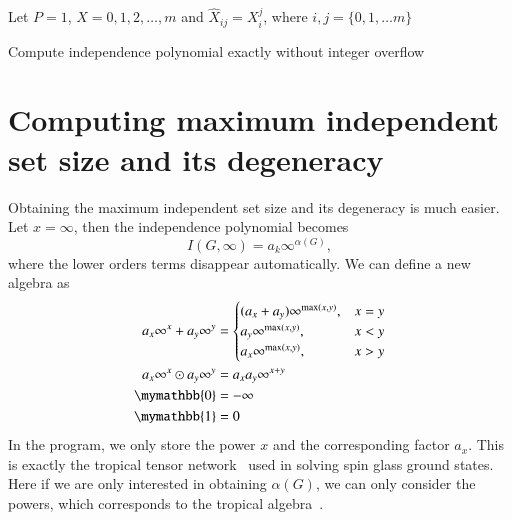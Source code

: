 \documentclass{article}
\newcommand{\<}{\langle}
\renewcommand{\>}{\rangle}
\renewcommand{\cite}[1]{{\citep{#1}}}
\theoremstyle{definition}\newtheorem{definition}{\textit{Definition}}
\begin{document}
\begin{algorithm}[!ht]
    \small
    \SetAlgoNoLine
    \LinesNumbered
    Let $P = 1$, $X = {0,1,2,\ldots,m}$ and $\hat X_{ij} = X_i^j$, where $i,j = \{0, 1, \ldots m\}$\;
    \caption{Compute independence polynomial exactly without integer overflow}\label{alg:finitefield}
\end{algorithm}

\section{Computing maximum independent set size and its degeneracy}
Obtaining the maximum independent set size and its degeneracy is much easier. Let $x=\infty$, then the independence polynomial becomes
\begin{equation}
I(G, \infty) = a_k \infty^{\alpha(G)},
\end{equation}
where the lower orders terms disappear automatically. We can define a new algebra as
\begin{align}
\begin{split}
    a_x\infty^x + a_y\infty^y &= \begin{cases}
        (a_x + a_y)\infty^{\max(x,y)}, & x = y\\
        a_y\infty^{\max(x,y)}, & x < y\\
        a_x\infty^{\max(x,y)}, & x > y
    \end{cases}\\
    a_x\infty^x \odot a_y\infty^y &= a_x a_y\infty^{x+y}\\
    \mymathbb{0} &= -\infty\\
    \mymathbb{1} &= 0
\end{split}
\end{align}
In the program, we only store the power $x$ and the corresponding factor $a_x$. This is exactly the tropical tensor network~\cite{Liu2021} used in solving spin glass ground states.
Here if we are only interested in obtaining $\alpha(G)$, we can only consider the powers, which corresponds to the tropical algebra~\cite{Maclagan2015}.
\end{document}
